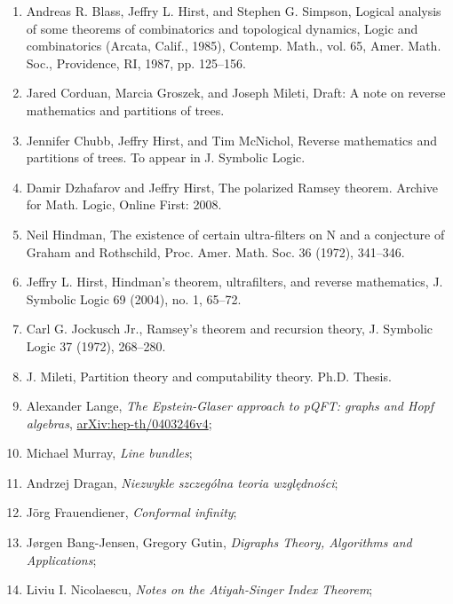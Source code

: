 \documentclass[a4paper,11pt]{article}
\begin{document}
\begin{enumerate}
\item Andreas R. Blass, Jeffry L. Hirst, and Stephen G. Simpson,
  Logical analysis of some theorems of combinatorics and topological
  dynamics, Logic and combinatorics (Arcata, Calif., 1985), Contemp.
  Math., vol. 65, Amer. Math. Soc., Providence, RI, 1987, pp. 125–156.

\item Jared Corduan, Marcia Groszek, and Joseph Mileti, Draft: A note
  on reverse mathematics and partitions of trees.

\item Jennifer Chubb, Jeffry Hirst, and Tim McNichol, Reverse
  mathematics and partitions of trees. To appear in J. Symbolic Logic.

\item Damir Dzhafarov and Jeffry Hirst, The polarized Ramsey theorem.
  Archive for Math. Logic, Online First: 2008.

\item Neil Hindman, The existence of certain ultra-filters on N and a
  conjecture of Graham and Rothschild, Proc. Amer. Math. Soc. 36
  (1972), 341–346.

\item Jeffry L. Hirst, Hindman’s theorem, ultrafilters, and reverse
  mathematics, J. Symbolic Logic 69 (2004), no. 1, 65–72.

\item Carl G. Jockusch Jr., Ramsey’s theorem and recursion theory, J.
  Symbolic Logic 37 (1972), 268–280.

\item J. Mileti, Partition theory and computability theory. Ph.D.
  Thesis.

\item Alexander Lange, \emph{The Epstein-Glaser approach to pQFT:
    graphs and Hopf algebras},
  \href{https://arxiv.org/abs/hep-th/0403246v4}{arXiv:hep-th/0403246v4};

\item Michael Murray, \emph{Line bundles};

\item Andrzej Dragan, \emph{Niezwykle szczególna teoria względności};

\item J\"{o}rg Frauendiener, \emph{Conformal infinity};

\item J\o rgen Bang-Jensen, Gregory Gutin, \emph{Digraphs Theory,
    Algorithms and Applications};

\item Liviu I. Nicolaescu, \emph{Notes on the Atiyah-Singer Index
    Theorem};


\end{enumerate}
\end{document}
